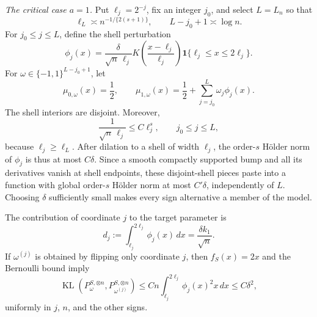 \emph{The critical case \(a=1\).}
Put \(\ell_j=2^{-j}\), fix an integer \(j_0\), and select \(L=L_n\) so that
\[
 \ell_L\asymp n^{-1/\{2(s+1)\}},
 \qquad
 L-j_0+1\asymp\log n.
\]
For \(j_0\le j\le L\), define the shell perturbation
\[
 \phi_j(x)=\frac{\delta}{\sqrt n\,\ell_j}
 K\!\left(\frac{x-\ell_j}{\ell_j}\right)
 \mathbf 1\{\ell_j\le x\le2\ell_j\}.
\]
For \(\omega\in\{-1,1\}^{L-j_0+1}\), let
\[
 \mu_{0,\omega}(x)=\frac12,
 \qquad
 \mu_{1,\omega}(x)=\frac12+
 \sum_{j=j_0}^L\omega_j\phi_j(x).
\]
The shell interiors are disjoint.  Moreover,
\[
 \frac1{\sqrt n\,\ell_j}
 \le C\ell_j^s,
 \qquad j_0\le j\le L,
\]
because \(\ell_j\ge\ell_L\).  After dilation to a shell of width \(\ell_j\), the order-\(s\) Hölder norm of \(\phi_j\) is thus at most \(C\delta\).  Since a smooth compactly supported bump and all its derivatives vanish at shell endpoints, these disjoint-shell pieces paste into a function with global order-\(s\) Hölder norm at most \(C'\delta\), independently of \(L\).  Choosing \(\delta\) sufficiently small makes every sign alternative a member of the model.

The contribution of coordinate \(j\) to the target parameter is
\[
 d_j:=\int_{\ell_j}^{2\ell_j}\phi_j(x)\,dx
 =\frac{\delta k_1}{\sqrt n}.
\]
If \(\omega^{(j)}\) is obtained by flipping only coordinate \(j\), then \(f_S(x)=2x\) and the Bernoulli bound imply
\[
 \operatorname{KL}(P_\omega^{S,\otimes n},
                    P_{\omega^{(j)}}^{S,\otimes n})
 \le Cn\int_{\ell_j}^{2\ell_j}\phi_j(x)^2x\,dx
 \le C\delta^2,
\]
uniformly in \(j\), \(n\), and the other signs.

